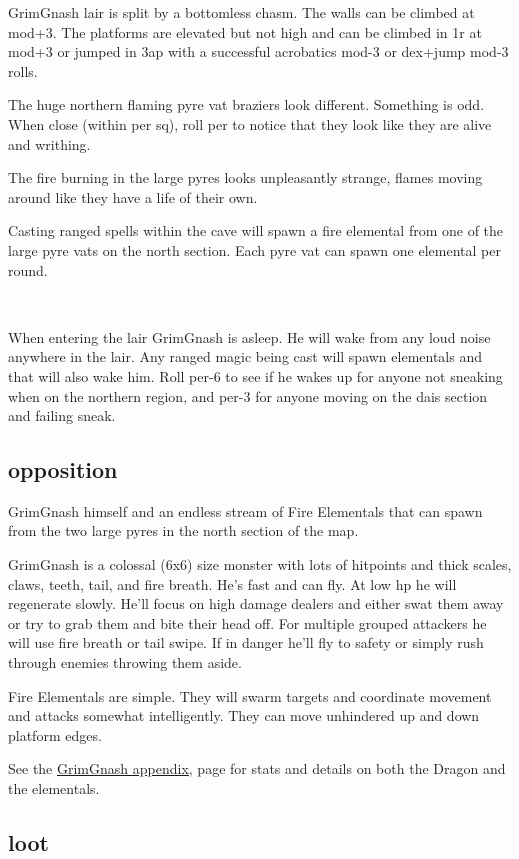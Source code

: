 GrimGnash lair is split by a bottomless chasm. The walls can be climbed at mod+3. The platforms are elevated but not high and can be climbed in 1r at mod+3 or jumped in 3ap with a successful acrobatics mod-3 or dex+jump mod-3 rolls. 

The huge northern flaming pyre vat braziers look different. Something is odd. When close (within per sq), roll per to notice that they look like they are alive and writhing. 
\begin{readoutloud}
The fire burning in the large pyres looks unpleasantly strange, flames moving around like they have a life of their own.
\end{readoutloud}
Casting ranged spells within the cave will spawn a fire elemental from one of the large pyre vats on the north section. Each pyre vat can spawn one elemental per round.

\

When entering the lair GrimGnash is asleep. He will wake from any loud noise anywhere in the lair. Any ranged magic being cast will spawn elementals and that will also wake him. Roll per-6 to see if he wakes up for anyone not sneaking when on the northern region, and per-3 for anyone moving on the dais section and failing sneak.


\subsection*{opposition}

GrimGnash himself and an endless stream of Fire Elementals that can spawn from the two large pyres in the north section of the map.

GrimGnash is a colossal (6x6) size monster with lots of hitpoints and thick scales, claws, teeth, tail, and fire breath. He's fast and can fly. At low hp he will regenerate slowly. He'll focus on high damage dealers and either swat them away or try to grab them and bite their head off. For multiple grouped attackers he will use fire breath or tail swipe. If in danger he'll fly to safety or simply rush through enemies throwing them aside.

Fire Elementals are simple. They will swarm targets and coordinate movement and attacks somewhat intelligently. They can move unhindered up and down platform edges.

See the \hyperref[appendixgrimgnash]{GrimGnash appendix}, page \pageref{appendixgrimgnash} for stats and details on both the Dragon and the elementals.


\subsection*{loot}

